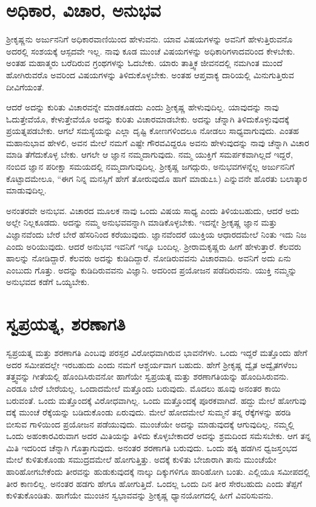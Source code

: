 \section*{ಅಧಿಕಾರ, ವಿಚಾರ, ಅನುಭವ}

ಶ್ರೀಕೃಷ್ಣನು ಅರ್ಜುನನಿಗೆ ಅಧಿಕಾರವಾಣಿಯಿಂದ ಹೇಳುವನು. ಯಾವ ವಿಷಯಗಳನ್ನು ಅವನಿಗೆ ಹೇಳುತ್ತಿರುವನೊ ಅದರಲ್ಲಿ ಸಂಶಯಕ್ಕೆ ಆಸ್ಪದವೇ ಇಲ್ಲ. ನಾವು ಕೂಡ ಮುಂಚೆ ವಿಷಯಗಳನ್ನು ಅಧಿಕಾರಿಗಳಾದವರಿಂದ ಕೇಳಬೇಕು. ಅಂತಹ ಮಹಾತ್ಮರು ಬರೆದಿರುವ ಗ್ರಂಥಗಳನ್ನು ಓದಬೇಕು. ಯಾರು ತಾತ್ತ್ವಿಕ ಜೀವನದಲ್ಲಿ ನಮಗಿಂತ ಮುಂದೆ ಹೋಗಿರುವರೊ ಅವರಿಂದ ವಿಷಯಗಳನ್ನು ತಿಳಿದುಕೊಳ್ಳಬೇಕು. ಅಂತಹ ಆಪ್ತವಾಕ್ಯ ದಾರಿಯಲ್ಲಿ ಮಿನುಗುತ್ತಿರುವ ದೀವಿಗೆಯಂತೆ.

ಆದರೆ ಅದನ್ನು ಕುರಿತು ವಿಚಾರವನ್ನೇ ಮಾಡಕೂಡದು ಎಂದು ಶ್ರೀಕೃಷ್ಣ ಹೇಳುವುದಿಲ್ಲ. ಯಾವುದನ್ನು ನಾವು ಓದುತ್ತೇವೆಯೊ, ಕೇಳುತ್ತೇವೆಯೊ ಅದನ್ನು ಕುರಿತು ವಿಚಾರಮಾಡಬೇಕು. ಅದನ್ನು ಚೆನ್ನಾಗಿ ತಿಳಿದುಕೊಳ್ಳುವುದಕ್ಕೆ ಪ್ರಯತ್ನಪಡಬೇಕು. ಆಗಲೆ ಸಮಸ್ಯೆಯನ್ನು ಎಲ್ಲಾ ದೃಷ್ಟಿ ಕೋಣಗಳಿಂದಲೂ ನೋಡಲು ಸಾಧ್ಯವಾಗುವುದು. ಎಂತಹ ಮಹಾನುಭಾವ ಹೇಳಲಿ, ಅವನ ಮೇಲೆ ನಮಗೆ ಎಷ್ಟೇ ಗೌರವವಿದ್ದರೂ ಅವನು ಹೇಳುವುದನ್ನು ನಾವು ಚೆನ್ನಾಗಿ ವಿಚಾರ ಮಾಡಿ ತೆಗೆದುಕೊಳ್ಳ ಬೇಕು. ಆಗಲೇ ಆ ಜ್ಞಾನ ನಮ್ಮದಾಗುವುದು. ನಮ್ಮ ಯುಕ್ತಿಗೆ ಸಮರ್ಪಕವಾಗಿಲ್ಲದೆ ಇದ್ದರೆ, ನಂಬಿದ ಜ್ಞಾನ ಪರೀಕ್ಷಾ ಸಮಯದಲ್ಲಿ ನಮ್ಮದಾಗುವುದಿಲ್ಲ. ಶ್ರೀಕೃಷ್ಣ ಜಗದ್ಗುರು, ಅನುಭವಗಳನ್ನೆಲ್ಲ ಅರ್ಜುನನಿಗೆ ಕೊಟ್ಟಾದಮೇಲೂ, “ಈಗ ನಿನ್ನ ಮನಸ್ಸಿಗೆ ಹೇಗೆ ತೋರುವುದೊ ಹಾಗೆ ಮಾಡು೭೩) ಎನ್ನುವನೇ ಹೊರತು ಬಲಾತ್ಕಾರ ಮಾಡುವುದಿಲ್ಲ.

ಅನಂತರವೇ ಅನುಭವ. ವಿಚಾರದ ಮೂಲಕ ನಾವು ಒಂದು ವಿಷಯ ಸಾಧ್ಯ ಎಂದು ತಿಳಿಯಬಹುದು, ಆದರೆ ಅದು ಅಲ್ಲೇ ನಿಲ್ಲಕೂಡದು. ಅದನ್ನು ನಮ್ಮ ಅನುಭವವನ್ನಾಗಿ ಮಾಡಿಕೊಳ್ಳಬೇಕು. ಇದನ್ನೇ ಶ್ರೀಕೃಷ್ಣ ಜ್ಞಾನ ಮತ್ತು ವಿಜ್ಞಾನವೆಂದು ಬೇರೆ ಬೇರೆ ಹೆಸರಿನಿಂದ ಕರೆಯುವುದು. ಜ್ಞಾನವೆಂದರೆ ಯುಕ್ತಿಯ ಆಧಾರದಮೇಲೆ ನಿಂತು ಇದು ನಿಜ ಎಂದು ಅರಿಯುವುದು. ಆದರೆ ಅನುಭವ ಇವನಿಗೆ ಇನ್ನೂ ಬಂದಿಲ್ಲ. ಶ್ರೀರಾಮಕೃಷ್ಣರು ಹೀಗೆ ಹೇಳುತ್ತಾರೆ. ಕೆಲವರು ಹಾಲನ್ನು ನೋಡಿದ್ದಾರೆ. ಕೆಲವರು ಅದನ್ನು ಕುಡಿದಿದ್ದಾರೆ. ನೋಡಿರುವವನು ವಿಚಾರವಾದಿ. ಅವನಿಗೆ ಅದು ಏನು ಎಂಬುದು ಗೊತ್ತು. ಅದನ್ನು ಕುಡಿದಿರುವವನು ವಿಜ್ಞಾನಿ. ಅದರಿಂದ ಪ್ರಯೋಜನ ಪಡೆದಿರುವನು. ಯುಕ್ತಿ ನಮ್ಮನ್ನು ಅನುಭವದ ಕಡೆಗೆ ಒಯ್ಯಬೇಕು.


\section*{ಸ್ವಪ್ರಯತ್ನ, ಶರಣಾಗತಿ}

ಸ್ವಪ್ರಯತ್ನ ಮತ್ತು ಶರಣಾಗತಿ ಎಂಬವು ಪರಸ್ಪರ ವಿರೋಧವಾಗಿರುವ ಭಾವನೆಗಳು. ಒಂದು ಇದ್ದರೆ ಮತ್ತೊಂದು ಹೇಗೆ ಅದರ ಸಮೀಪದಲ್ಲೇ ಇರಬಹುದು ಎಂದು ನಮಗೆ ಆಶ್ಚರ್ಯವಾಗ ಬಹುದು. ಹೇಗೆ ಶ್ರೀಕೃಷ್ಣ ದ್ವೈತ ಅದ್ವೈತಗಳೆಂಬ ತತ್ತ್ವವನ್ನು ಗೀತೆಯಲ್ಲಿ ಹೊಂದಿಸಿರುವನೋ ಹಾಗೆಯೇ ಸ್ವಪ್ರಯತ್ನ ಮತ್ತು ಶರಣಾಗತಿಯನ್ನು ಹೊಂದಿಸಿರುವನು. ಎರಡೂ ಬೇರೆ ಬೇರೆಯಲ್ಲ. ಒಂದಾದಮೇಲೆ ಮತ್ತೊಂದು ಬರುವುದು. ಮೊದಲು ಹೂವು ಅನಂತರ ಕಾಯಿ ಬರುವಂತೆ. ಒಂದು ಮತ್ತೊಂದಕ್ಕೆ ವಿರೋಧವಾಗಿಲ್ಲ. ಒಂದು ಮತ್ತೊಂದಕ್ಕೆ ಪೂರಕವಾಗಿದೆ. ಹದ್ದು ಮೇಲೆ ಹೋಗುವು ದಕ್ಕೆ ಮುಂಚೆ ರೆಕ್ಕೆಯನ್ನು ಬಡಿದುಕೊಂಡು ಏರುವುದು. ಮೇಲೆ ಹೋದಮೇಲೆ ಸುಮ್ಮನೆ ತನ್ನ ರೆಕ್ಕೆಗಳನ್ನು ಹರಡಿ ಬೀಸುವ ಗಾಳಿಯಿಂದ ಪ್ರಯೋಜನ ಪಡೆಯುವುದು. ಮುಂಚೆಯೇ ಅದನ್ನು ಮಾಡುವುದಕ್ಕೆ ಆಗುವುದಿಲ್ಲ. ನಮ್ಮಲ್ಲಿ ಒಂದು ಅಹಂಕಾರವಿರುವಾಗ ಅದರ ಮಿತಿಯನ್ನು ತಿಳಿದು ಕೊಳ್ಳಬೇಕಾದರೆ ಅದನ್ನು ಶ್ರಮದಿಂದ ಸಮೆಸಬೇಕು. ಆಗ ತನ್ನ ಮಿತಿ ಇದರಿಂದ ಚೆನ್ನಾಗಿ ಗೊತ್ತಾಗುವುದು. ಅನಂತರ ಶರಣಾಗತಿ ಬರುವುದು. ಒಂದು ಹಕ್ಕಿ ಹಡಗಿನ ಧ್ವಜಸ್ತಂಭದ ಮೇಲೆ ಕುಳಿತುಕೊಂಡು ಸಮುದ್ರದಮೇಲೆ ಹೋಗುತ್ತಿತ್ತು. ಅದಕ್ಕೆ ಕುಳಿತು ಬೇಜಾರಾಗಿ ತಾನು ಮುಂಚೆಯೇ ಹಾರಿಹೋಗಬೇಕೆಂದು ತೀರವನ್ನು ಹುಡುಕುವುದಕ್ಕೆ ನಾಲ್ಕು ದಿಕ್ಕುಗಳಿಗೂ ಹಾರಿಹೋಗಿ ಬಂತು. ಎಲ್ಲಿಯೂ ಸಮೀಪದಲ್ಲಿ ತೀರ ಕಾಣಲಿಲ್ಲ. ಅನಂತರ ಹಡಗು ಹೇಗೂ ಹೋಗುತ್ತಿದೆ. ಒಂದಲ್ಲ ಒಂದು ದಿನ ತೀರ ಸೇರಬಹುದು ಎಂದು ತೆಪ್ಪಗೆ ಕುಳಿತುಕೊಂಡಿತು. ಹಾಗೆಯೇ ಮುಂಚಿನ ಸ್ವಭಾವವನ್ನು ಶ್ರೀಕೃಷ್ಣ ಧ್ಯಾನಯೋಗದಲ್ಲಿ ಹೀಗೆ ವಿವರಿಸುವನು.

